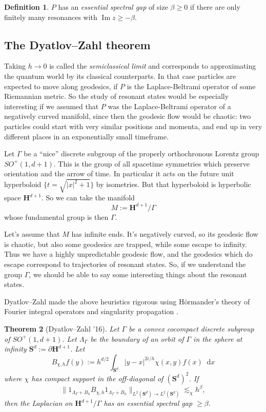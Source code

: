 \documentclass[reqno,12pt]{amsart}
\newcommand*\dif{\mathop{}\!\mathrm{d}}
\newcommand{\dfn}[1]{\emph{#1}\index{#1}}
\renewcommand{\Im}{\operatorname{Im}}
\newtheorem{theorem}{Theorem}[section]
\theoremstyle{definition}
\newtheorem{definition}[theorem]{Definition}
\numberwithin{equation}{section}
\begin{document}
\begin{definition}
    $P$ has an \dfn{essential spectral gap} of size $\beta \geq 0$ if there are only finitely many resonances with $\Im z \geq -\beta$.
\end{definition}

\subsection{The Dyatlov--Zahl theorem}
Taking $h \to 0$ is called the \dfn{semiclassical limit} and corresponds to approximating the quantum world by its classical counterparts.
In that case particles are expected to move along geodesics, if $P$ is the Laplace-Beltrami operator of some Riemannian metric. 
So the study of resonant states would be especially interesting if we assumed that $P$ was the Laplace-Beltrami operator of a negatively curved manifold, since then the geodesic flow would be chaotic: two particles could start with very similar positions and momenta, and end up in very different places in an exponentially small timeframe.

Let $\Gamma$ be a ``nice'' discrete subgroup of the properly orthochronous Lorentz group $SO^+(1, d + 1)$.
This is the group of all spacetime symmetries which preserve orientation and the arrow of time.
In particular it acts on the future unit hyperboloid $\{t = \sqrt{|x|^2 + 1}\}$ by isometries.
But that hyperboloid is hyperbolic space $\mathbf H^{d + 1}$.
So we can take the manifold 
$$M := \mathbf H^{d + 1}/\Gamma$$
whose fundamental group is then $\Gamma$.

Let's assume that $M$ has infinite ends. 
It's negatively curved, so its geodesic flow is chaotic, but also some geodesics are trapped, while some escape to infinity.
Thus we have a highly unpredictable geodesic flow, and the geodesics which do escape correspond to trajectories of resonant states.
So, if we understand the group $\Gamma$, we should be able to say some interesting things about the resonant states.

Dyatlov--Zahl made the above heuristics rigorous using H\"ormander's theory of Fourier integral operators and singularity propagation \cite{Dyatlov_2016}.

\begin{theorem}[Dyatlov--Zahl '16]
    Let $\Gamma$ be a convex cocompact discrete subgroup of $SO^+(1, d + 1)$.
    Let $\Lambda_\Gamma$ be the boundary of an orbit of $\Gamma$ in the sphere at infinity $\mathbf S^d := \partial \mathbf H^{d + 1}$.
    Let 
    $$B_{\chi, h} f(y) := h^{d/2} \int_{\mathbf S^d} |y - x|^{2i/h} \chi(x, y) f(x) \dif x$$
    where $\chi$ has compact support in the off-diagonal of $(\mathbf S^d)^2$.
    If 
    $$\|1_{\Lambda_\Gamma + B_h} B_{\chi, h} 1_{\Lambda_\Gamma + B_h}\|_{L^2(\mathbf S^d) \to L^2(\mathbf S^d)} \lesssim_\chi h^\beta,$$
    then the Laplacian on $\mathbf H^{d + 1}/\Gamma$ has an essential spectral gap $\geq \beta$.
\end{theorem}
\end{document}
